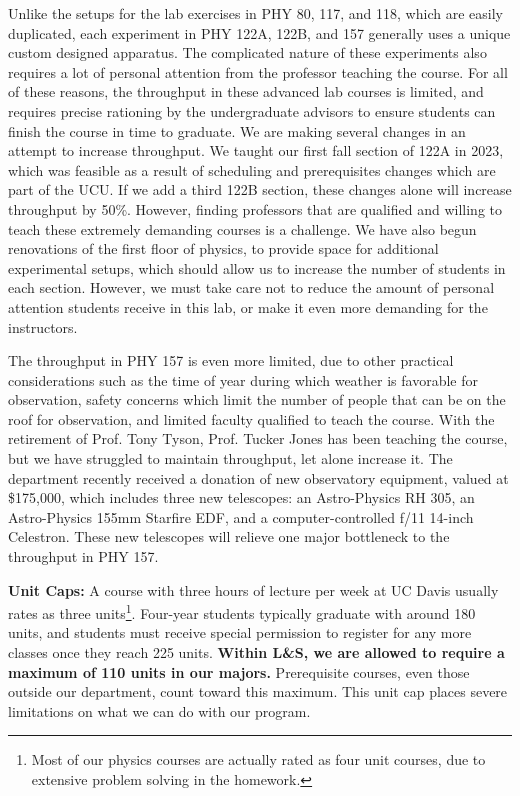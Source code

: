 \documentclass[12pt]{article}
\begin{document}
Unlike the setups for the lab exercises in PHY 80, 117, and 118,
which are easily duplicated, each experiment in PHY 122A, 122B, and
157 generally uses a unique custom designed apparatus.  The
complicated nature of these experiments also requires a lot of personal
attention from the professor teaching the course.  For all of these
reasons, the throughput in these advanced lab courses is limited, and
requires precise rationing by the undergraduate advisors to ensure
students can finish the course in time to graduate.  We are making
several changes in an attempt to increase throughput.  We taught our
first fall section of 122A in 2023, which was feasible as a result of
scheduling and prerequisites changes which are part of the UCU.  If we
add a third 122B section, these changes alone will increase throughput
by 50\%.  However, finding professors that are qualified and willing
to teach these extremely demanding courses is a challenge.  We have
also begun renovations of the first floor of physics, to provide space
for additional experimental setups, which should allow us to increase
the number of students in each section.  However, we must take care
not to reduce the amount of personal attention students receive in
this lab, or make it even more demanding for the instructors.

The throughput in PHY 157 is even more limited, due to other practical
considerations such as the time of year during which weather is
favorable for observation, safety concerns which limit the number of
people that can be on the roof for observation, and limited faculty
qualified to teach the course.  With the retirement of Prof. Tony
Tyson, Prof. Tucker Jones has been teaching the course, but we have
struggled to maintain throughput, let alone increase it.  The department recently received a donation of new observatory equipment, valued at \$175,000, which includes three new telescopes: an Astro-Physics RH 305, an Astro-Physics 155mm Starfire EDF, and a computer-controlled f/11 14-inch Celestron.  These new telescopes will relieve one major bottleneck to the throughput in PHY 157.

\noindent
{\bf Unit Caps:} A course with three hours of lecture per week
at UC Davis usually rates as three units\footnote{Most of our physics courses
  are actually rated as four unit courses, due to extensive problem
  solving in the homework.}.  Four-year students typically graduate
with around 180 units, and students must receive special permission to
register for any more classes once they reach 225 units.  {\bf Within
  L\&S, we are allowed to require a maximum of 110 units in our
  majors.} Prerequisite courses, even those outside our department,
count toward this maximum.  This unit cap places severe limitations on
what we can do with our program.
\end{document}
